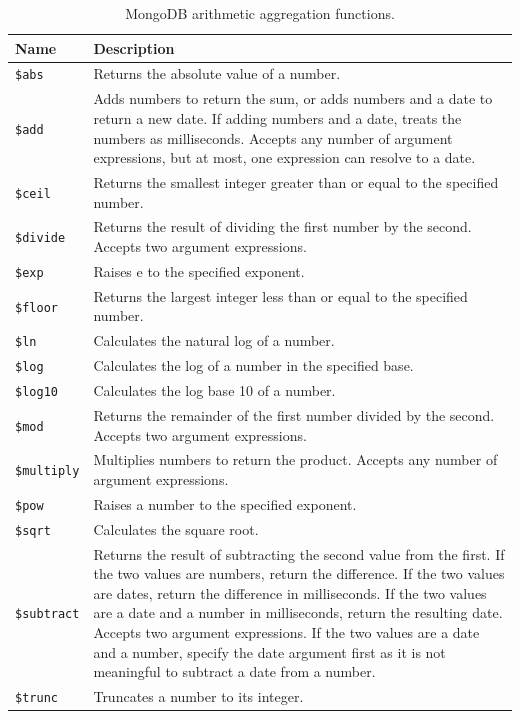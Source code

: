 \begin{table}
	\centering \caption{MongoDB arithmetic aggregation functions.}\label{tab:mongodb_arithmetic_aggregation}
	\begin{tabularx}{\textwidth}{lX}
		\hline
		Name & Description \\ \hline
		\verb|$abs| &	Returns the absolute value of a number. \\
		\verb|$add| &	Adds numbers to return the sum, or adds numbers and a date to return a new date. If adding numbers and a date, treats the numbers as milliseconds. Accepts any number of argument expressions, but at most, one expression can resolve to a date. \\
		\verb|$ceil| &	Returns the smallest integer greater than or equal to the specified number. \\
		\verb|$divide| &	Returns the result of dividing the first number by the second. Accepts two argument expressions. \\
		\verb|$exp| &	Raises e to the specified exponent. \\
		\verb|$floor| &	Returns the largest integer less than or equal to the specified number. \\
		\verb|$ln| &	Calculates the natural log of a number. \\
		\verb|$log| &	Calculates the log of a number in the specified base. \\
		\verb|$log10| &	Calculates the log base 10 of a number. \\
		\verb|$mod| &	Returns the remainder of the first number divided by the second. Accepts two argument expressions. \\
		\verb|$multiply| &	Multiplies numbers to return the product. Accepts any number of argument expressions. \\
		\verb|$pow| &	Raises a number to the specified exponent. \\
		\verb|$sqrt| &	Calculates the square root. \\
		\verb|$subtract| &	Returns the result of subtracting the second value from the first. If the two values are numbers, return the difference. If the two values are dates, return the difference in milliseconds. If the two values are a date and a number in milliseconds, return the resulting date. Accepts two argument expressions. If the two values are a date and a number, specify the date argument first as it is not meaningful to subtract a date from a number. \\
		\verb|$trunc| &	Truncates a number to its integer. \\
		\hline
	\end{tabularx}
\end{table}

